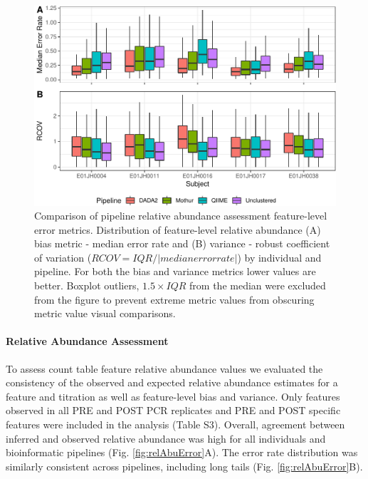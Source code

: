 \documentclass{bmcart}
\begin{document}
\begin{figure}
\centering
\includegraphics{relAbuErrorMetrics-1.pdf}
\caption{\label{fig:relAbuErrorMetrics}Comparison of pipeline relative
abundance assessment feature-level error metrics. Distribution of
feature-level relative abundance (A) bias metric - median error rate and
(B) variance - robust coefficient of variation (\(RCOV=IQR/|median error rate|\)) by individual and pipeline.
For both the bias and variance metrics lower values are better.
Boxplot outliers, \(1.5\times IQR\) from the median were excluded from the figure to prevent extreme metric values
from obscuring metric value visual comparisons.}
\end{figure}


\paragraph{Relative Abundance Assessment}
To assess count table feature relative abundance values we evaluated the consistency of
the observed and expected relative abundance estimates for a feature and
titration as well as feature-level bias and variance.
Only features observed in all PRE and POST PCR replicates
and PRE and POST specific features were included in the analysis (Table S3). Overall, agreement between inferred
and observed relative abundance was high for all individuals and
bioinformatic pipelines (Fig. \ref{fig:relAbuError}A). The error rate
distribution was similarly consistent across pipelines, including long
tails (Fig. \ref{fig:relAbuError}B).
\end{document}

